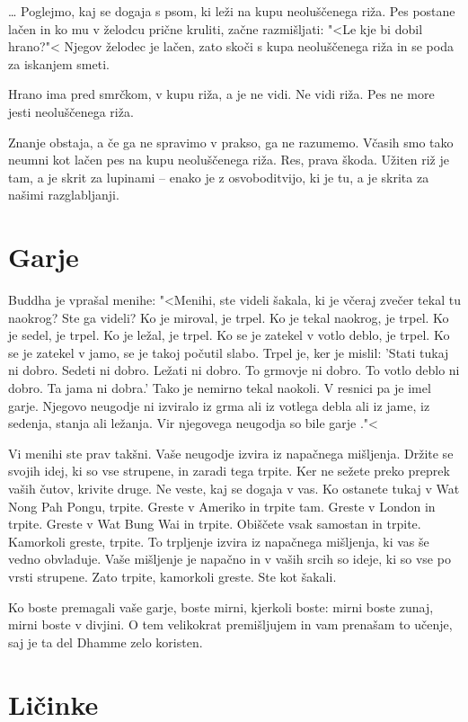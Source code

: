 \ldots{} Poglejmo, kaj se dogaja s psom, ki leži na kupu neoluščenega riža. Pes postane lačen in ko mu v želodcu prične kruliti, začne razmišljati: "<Le kje bi dobil hrano?"< Njegov želodec je lačen, zato skoči s kupa neoluščenega riža in se poda za iskanjem smeti.

Hrano ima pred smrčkom, v kupu riža, a je ne vidi. Ne vidi riža. Pes ne more jesti neoluščenega riža.

Znanje obstaja, a če ga ne spravimo v prakso, ga ne razumemo. Včasih smo tako neumni kot lačen pes na kupu neoluščenega riža. Res, prava škoda. Užiten riž je tam, a je skrit za lupinami – enako je z osvoboditvijo, ki je tu, a je skrita za našimi razglabljanji.

\section{Garje}

Buddha je vprašal menihe: "<Menihi, ste videli šakala, ki je včeraj zvečer tekal tu naokrog? Ste ga videli? Ko je miroval, je trpel. Ko je tekal naokrog, je trpel. Ko je sedel, je trpel. Ko je ležal, je trpel. Ko se je zatekel v votlo deblo, je trpel. Ko se je zatekel v jamo, se je takoj počutil slabo. Trpel je, ker je mislil: 'Stati tukaj ni dobro. Sedeti ni dobro. Ležati ni dobro. To grmovje ni dobro. To votlo deblo ni dobro. Ta jama ni dobra.' Tako je nemirno tekal naokoli. V resnici pa je imel garje. Njegovo neugodje ni izviralo iz grma ali iz votlega debla ali iz jame, iz sedenja, stanja ali ležanja. Vir njegovega neugodja so bile garje ."<

Vi menihi ste prav takšni. Vaše neugodje izvira iz napačnega mišljenja. Držite se svojih idej, ki so vse strupene, in zaradi tega trpite. Ker ne sežete preko preprek vaših čutov, krivite druge. Ne veste, kaj se dogaja v vas. Ko ostanete tukaj v Wat Nong Pah Pongu, trpite. Greste v Ameriko in trpite tam. Greste v London in trpite. Greste v Wat Bung Wai in trpite. Obiščete vsak samostan in trpite. Kamorkoli greste, trpite. To trpljenje izvira iz napačnega mišljenja, ki vas še vedno obvladuje. Vaše mišljenje je napačno in v vaših srcih so ideje, ki so vse po vrsti strupene. Zato trpite, kamorkoli greste. Ste kot šakali.

Ko boste premagali vaše garje, boste mirni, kjerkoli boste: mirni boste zunaj, mirni boste v divjini. O tem velikokrat premišljujem in vam prenašam to učenje, saj je ta del Dhamme zelo koristen.

\section{Ličinke}

